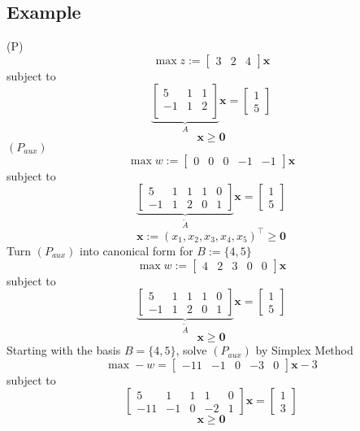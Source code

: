 \subsection{Example}
(P)
\[ \max z:=\begin{bmatrix} 3 & 2 & 4 \end{bmatrix} \bm{x} \]
subject to
\[
    \underbrace{
    \begin{bmatrix}
        5 & 1 & 1\\
        -1 & 1 & 2\\
    \end{bmatrix}}_{A}
    \bm{x}=
    \begin{bmatrix}
        1\\
        5
    \end{bmatrix}
\]
\[\bm{x}\ge \bm{0}\]
$ (P_{aux}) $ 
\[ \max w:=\left[\begin{array}{ccccc}
0 & 0 & 0 & -1 & -1
\end{array}\right] \bm{x} \]
subject to
\[
    \underbrace{\left[
    \begin{array}{ccccc}
        5 & 1 & 1 & 1 & 0\\
        -1 & 1 & 2 & 0 & 1
    \end{array}\right]}_{\tilde{A}}
    \bm{x}=
    \begin{bmatrix}
        1\\
        5
    \end{bmatrix}
\]
\[ \bm{x}:=(x_1,x_2,x_3,x_4,x_5)^\top \ge \bm{0} \]
Turn $ (P_{aux}) $ into canonical form for $ B:=\{4,5\} $
\[ \max w:=\left[\begin{array}{ccccc}
4 & 2 & 3 & 0 & 0
\end{array}\right] \bm{x} \]
subject to
\[
    \underbrace{\left[
    \begin{array}{ccccc}
        5 & 1 & 1 & 1 & 0\\
        -1 & 1 & 2 & 0 & 1
    \end{array}\right]}_{\tilde{A}}
    \bm{x}=
    \begin{bmatrix}
        1\\
        5
    \end{bmatrix}
\]
\[ \bm{x}\ge \bm{0} \]
Starting with the basis $ B=\{4,5\} $, solve $ (P_{aux}) $
by Simplex Method
\[ \max -w=\begin{bmatrix}-11 & -1 & 0 & -3 & 0\end{bmatrix} \bm{x} - 3 \]
subject to
\[
    \begin{bmatrix}
        5 & 1 & 1 & 1 & 0\\
        -11 & -1 & 0 & -2 & 1
    \end{bmatrix}
    \bm{x}=
    \begin{bmatrix}
        1\\
        3
    \end{bmatrix}
\]
\[ \bm{x}\ge \bm{0} \]

